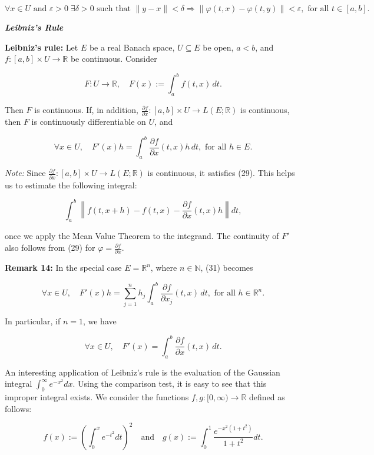 \documentclass{book}
\begin{document}
\[
\forall x \in U \text{ and } \varepsilon > 0 \; \exists \delta > 0 \text{ such that } \|y - x\| < \delta \Longrightarrow \|\varphi(t, x) - \varphi(t, y)\| < \varepsilon, \text{ for all } t \in [a, b].
\tag{29}
\]

\begin{center}
    \textbf{\textit{Leibniz's Rule}}
\end{center}

\textbf{Leibniz's rule:} Let $E$ be a real Banach space, $U \subseteq E$ be open, $a < b$, and $f : [a, b] \times U \to \mathbb{R}$ be continuous. Consider

\[
F : U \to \mathbb{R}, \quad F(x) := \int_a^b f(t, x)\, dt.
\tag{30}
\]

Then $F$ is continuous. If, in addition, $\frac{\partial f}{\partial x} : [a, b] \times U \to L(E; \mathbb{R})$ is continuous, then $F$ is continuously differentiable on $U$, and

\[
\forall x \in U, \quad F'(x)h = \int_a^b \frac{\partial f}{\partial x}(t, x)h \, dt, \text{ for all } h \in E.
\tag{31}
\]

\textit{Note:} Since $\frac{\partial f}{\partial x} : [a, b] \times U \to L(E; \mathbb{R})$ is continuous, it satisfies (29). This helps us to estimate the following integral:

\[
\int_a^b \left\| f(t, x + h) - f(t, x) - \frac{\partial f}{\partial x}(t, x)h \right\| dt,
\]

once we apply the Mean Value Theorem to the integrand. The continuity of $F'$ also follows from (29) for $\varphi = \frac{\partial f}{\partial x}$.


\textbf{Remark 14:} In the special case $E = \mathbb{R}^n$, where $n \in \mathbb{N}$, (31) becomes

\[
\forall x \in U, \quad F'(x)h = \sum_{j=1}^{n} h_j \int_a^b \frac{\partial f}{\partial x_j}(t, x)\, dt, \text{ for all } h \in \mathbb{R}^n.
\]

In particular, if $n = 1$, we have

\[
\forall x \in U, \quad F'(x) = \int_a^b \frac{\partial f}{\partial x}(t, x)\, dt.
\]

An interesting application of Leibniz's rule is the evaluation of the Gaussian integral $\int_0^{\infty} e^{-x^2} dx$. Using the comparison test, it is easy to see that this improper integral exists. We consider the functions $f, g : [0, \infty) \to \mathbb{R}$ defined as follows:

\[
f(x) := \left( \int_0^x e^{-t^2} dt \right)^2 \quad \text{and} \quad g(x) := \int_0^1 \frac{e^{-x^2(1+t^2)}}{1+t^2} dt.
\]
\end{document}

